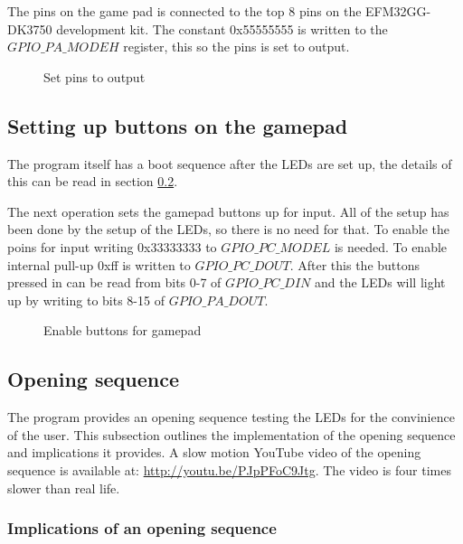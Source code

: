 The pins on the game pad is connected to the top 8 pins on the EFM32GG-DK3750 development kit. The constant 0x55555555 is written to the $GPIO\_PA\_MODEH$ register, this so the pins is set to output.

\begin{figure}[h!]
\caption{Set pins to output}
\label{code:set_drive_gpio_o}
\end{figure}

\subsection{Setting up buttons on the gamepad}
\label{subsec:dev_pros_button_setup}
The program itself has a boot sequence after the LEDs are set up, the details of this can be read in section \ref{subsec:dev_pros_opening_seq}.

The next operation sets the gamepad buttons up for input. All of the setup has been done by the setup of the LEDs, so there is no need for that. To enable the poins for input writing 0x33333333 to $GPIO\_PC\_MODEL$ is needed. To enable internal pull-up 0xff is written to $GPIO\_PC\_DOUT$. After this the buttons pressed in can be read from bits 0-7 of $GPIO\_PC\_DIN$ and the LEDs will light up by writing to bits 8-15 of $GPIO\_PA\_DOUT$.

\begin{figure}[h!]
\caption{Enable buttons for gamepad}
\label{code:set_drive_gpio_o}
\end{figure}

\subsection{Opening sequence}
\label{subsec:dev_pros_opening_seq}

The program provides an opening sequence testing the LEDs for the convinience of the user. This subsection outlines the implementation of the opening sequence and implications it provides. A slow motion YouTube video of the opening sequence is available at: \url{http://youtu.be/PJpPFoC9Jtg}. The video is four times slower than real life.

\subsubsection{Implications of an opening sequence}

